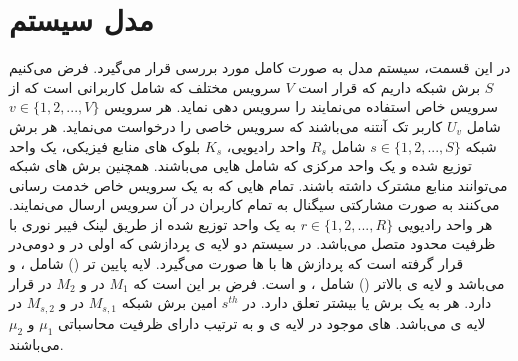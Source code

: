 \section{مدل سیستم}
در این قسمت، سیستم مدل به صورت کامل مورد بررسی قرار می‌گیرد.
فرض می‌کنیم $S$ برش شبکه داریم که قرار است $V$ سرویس مختلف که شامل کاربرانی است که از سرویس خاص استفاده می‌نمایند را سرویس دهی نماید.
هر سرویس 
$v\in \{1,2,...,V \} $
شامل 
$U_v$
کاربر تک آنتنه می‌باشند که سرویس خاصی را درخواست می‌نماید.
هر برش شبکه 
$s \in \{1,2,...,S \}$
شامل 
$R_s$
واحد رادیویی،
$K_s$
بلوک های منابع فیزیکی، یک واحد توزیع شده و یک واحد مرکزی که شامل  هایی می‌باشند.
همچنین برش های شبکه می‌توانند منابع مشترک داشته باشند.
تمام هایی که به یک سرویس خاص خدمت رسانی می‌کنند به صورت مشارکتی سیگنال به تمام کاربران در آن سرویس ارسال می‌نمایند. 
\cite{motalleb2017optimal,mimoCran}
هر واحد رادیویی
$r \in \{1,2,...,R \}$
به یک واحد توزیع شده از طریق لینک فیبر نوری با ظرفیت  
محدود متصل می‌باشد.
در سیستم 
دو لایه ی پردازشی که اولی در  و دومی‌در  قرار گرفته است که پردازش ها با  ها صورت می‌گیرد.
لایه پایین تر () شامل 
،
و 
می‌باشد و 
لایه ی بالاتر 
()
شامل 
،
و 
است.
فرض بر این است که $M_1$
در 
و 
$M_2$
در  قرار دارد.
هر  به یک برش یا بیشتر تعلق دارد.
در $s^{th}$ امین برش شبکه $M_{s,1}$ 
در 
و 
$M_{s,2}$
در لایه ی  می‌باشد.
های موجود در لایه ی  و  به ترتیب دارای ظرفیت محاسباتی 
$\mu_1$ 
و
 $\mu_2$
می‌باشند.
